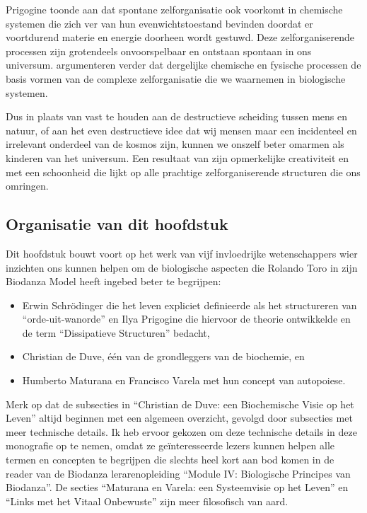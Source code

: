 \documentclass[
  11pt,
]{book}
\begin{document}
Prigogine toonde aan dat spontane zelforganisatie ook voorkomt in chemische systemen die zich ver van hun evenwichtstoestand bevinden doordat er voortdurend materie en energie doorheen wordt gestuwd. Deze zelforganiserende processen zijn grotendeels onvoorspelbaar en ontstaan spontaan in ons universum. \citet{prigogineStengers1984} argumenteren verder dat dergelijke chemische en fysische processen de basis vormen van de complexe zelforganisatie die we waarnemen in biologische systemen.

Dus in plaats van vast te houden aan de destructieve scheiding tussen mens en natuur, of aan het even destructieve idee dat wij mensen maar een incidenteel en irrelevant onderdeel van de kosmos zijn, kunnen we onszelf beter omarmen als kinderen van het universum. Een resultaat van zijn opmerkelijke creativiteit en met een schoonheid die lijkt op alle prachtige zelforganiserende structuren die ons omringen.

\subsection{Organisatie van dit hoofdstuk}\label{organisatie-van-dit-hoofdstuk}

Dit hoofdstuk bouwt voort op het werk van vijf invloedrijke wetenschappers wier inzichten ons kunnen helpen om de biologische aspecten die Rolando Toro in zijn Biodanza Model heeft ingebed beter te begrijpen:

\begin{itemize}
\item
  Erwin Schrödinger die het leven expliciet definieerde als het structureren van ``orde-uit-wanorde'' en Ilya Prigogine die hiervoor de theorie ontwikkelde en de term ``Dissipatieve Structuren'' bedacht,
\item
  Christian de Duve, één van de grondleggers van de biochemie, en
\item
  Humberto Maturana en Francisco Varela met hun concept van autopoiese.
\end{itemize}

Merk op dat de subsecties in ``Christian de Duve: een Biochemische Visie op het Leven'' altijd beginnen met een algemeen overzicht, gevolgd door subsecties met meer technische details. Ik heb ervoor gekozen om deze technische details in deze monografie op te nemen, omdat ze geïnteresseerde lezers kunnen helpen alle termen en concepten te begrijpen die slechts heel kort aan bod komen in de reader van de Biodanza lerarenopleiding ``Module IV: Biologische Principes van Biodanza''. De secties ``Maturana en Varela: een Systeemvisie op het Leven'' en ``Links met het Vitaal Onbewuste'' zijn meer filosofisch van aard.
\end{document}
